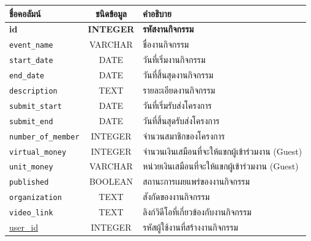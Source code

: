 \begin{table}[h]
    \centering
    \begin{adjustbox}{width=0.8\textwidth} %
        \begin{tabular}{|l|c|l|}
            \hline
            ชื่อคอลัมน์                  & ชนิดข้อมูล          & คำอธิบาย                                 \\ \hline
            \textbf{id}              & \textbf{INTEGER} & \textbf{รหัสงานกิจกรรม}                  \\ \hline
            \verb |event_name|       & VARCHAR          & ชื่องานกิจกรรม                            \\ \hline
            \verb |start_date|       & DATE             & วันที่เริ่มงานกิจกรรม                        \\ \hline
            \verb |end_date|         & DATE             & วันที่สิ้นสุดงานกิจกรรม                       \\ \hline
            \verb |description|      & TEXT             & รายละเอียดงานกิจกรรม                     \\ \hline
            \verb |submit_start|     & DATE             & วันที่เริ่มรับส่งโครงการ                      \\ \hline
            \verb |submit_end|       & DATE             & วันที่สิ้นสุดรับส่งโครงการ                     \\ \hline
            \verb |number_of_member| & INTEGER          & จำนวนสมาชิกของโครงการ                    \\ \hline
            \verb |virtual_money|    & INTEGER          & จำนวนเงินเสมือนที่จะให้แขกผู้เข้าร่วมงาน (Guest) \\ \hline
            \verb |unit_money|       & VARCHAR          & หน่วยเงินเสมือนที่จะให้แขกผู้เข้าร่วมงาน (Guest) \\ \hline
            \verb |published|        & BOOLEAN          & สถานะการเผยแพร่ของงานกิจกรรม             \\ \hline
            \verb |organization|     & TEXT             & สังกัดของงานกิจกรรม                       \\ \hline
            \verb |video_link|       & TEXT             & ลิงก์วิดีโอที่เกี่ยวข้องกับงานกิจกรรม             \\ \hline
            \underline{user\_id}     & INTEGER          & รหัสผู้ใช้งานที่สร้างงานกิจกรรม                \\ \hline

\end{tabular}
\end{adjustbox}
\end{table}
